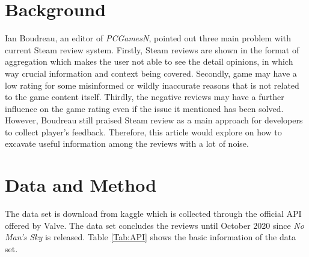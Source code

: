 \documentclass[12pt]{article}
\begin{document}
\section{Background}
\label{label:background}
Ian Boudreau, an editor of \textsl{PCGamesN}, pointed out three main problem with current Steam review system. Firstly, Steam reviews are shown in the format of aggregation which makes the user not able to see the detail opinions, in which way crucial information and context being covered. Secondly, game may have a low rating for some misinformed or wildly inaccurate reasons that is not related to the game content itself. Thirdly, the negative reviews may have a further influence on the game rating even if the issue it mentioned has been solved. However, Boudreau still praised Steam review as a main approach for developers to collect player's feedback. \citep{boudreau_2021} Therefore, this article would explore on how to excavate useful information among the reviews with a lot of noise. 

\section{Data and Method}
\label{Data-method}
The data set is download from kaggle which is collected through the official API offered by Valve. The data set concludes the reviews until October 2020 since \textsl{No Man's Sky} is released.
Table \ref{Tab:API} shows the basic information of the data set.
\end{document}
